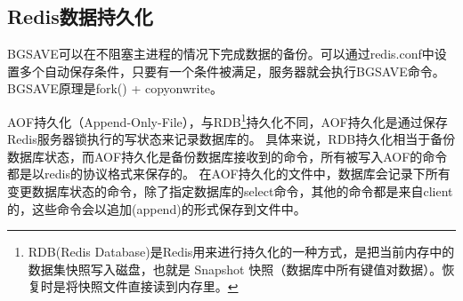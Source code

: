 \documentclass[../../../interview-questions.tex]{subfiles}
\begin{document}
\subsection{Redis数据持久化}

BGSAVE可以在不阻塞主进程的情况下完成数据的备份。可以通过redis.conf中设置多个自动保存条件，只要有一个条件被满足，服务器就会执行BGSAVE命令。BGSAVE原理是fork() + copyonwrite。

AOF持久化（Append-Only-File），与RDB\footnote{RDB(Redis Database)是Redis用来进行持久化的一种方式，是把当前内存中的数据集快照写入磁盘，也就是 Snapshot 快照（数据库中所有键值对数据）。恢复时是将快照文件直接读到内存里。}持久化不同，AOF持久化是通过保存Redis服务器锁执行的写状态来记录数据库的。
具体来说，RDB持久化相当于备份数据库状态，而AOF持久化是备份数据库接收到的命令，所有被写入AOF的命令都是以redis的协议格式来保存的。
在AOF持久化的文件中，数据库会记录下所有变更数据库状态的命令，除了指定数据库的select命令，其他的命令都是来自client的，这些命令会以追加(append)的形式保存到文件中。
\end{document}
